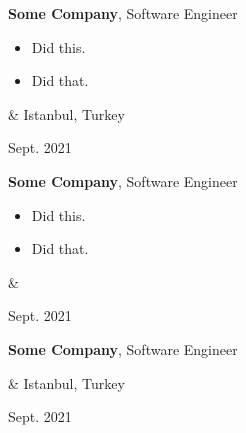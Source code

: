 \documentclass[10pt, letterpaper]{article}
\newenvironment{highlights}{
        \begin{itemize}[
                topsep=0pt,
                parsep=0.10 cm,
                partopsep=0pt,
                itemsep=0pt,
                after=\relax,
                leftmargin=0.4 cm + 3pt
            ]
    }{
        \end{itemize}
    } %
\let\originalTabularx\tabularx
\let\originalEndTabularx\endtabularx
\renewenvironment{tabularx}{\bgroup\centering\originalTabularx}{\originalEndTabularx\par\egroup}
\begin{document}
        \vspace{0.2 cm}
        \begin{tabularx}{
            \textwidth-0.4 cm-0.13cm
        }{
            K{0.2 cm}
            R{4.1 cm}
        }
            \textbf{Some Company}, Software Engineer

            \vspace{0.10 cm}

            \begin{highlights}
                \item Did this.
                \item Did that.
            \end{highlights}
            &
            Istanbul, Turkey

            Sept. 2021
        \end{tabularx}

        \vspace{0.2 cm}
        \begin{tabularx}{
            \textwidth-0.4 cm-0.13cm
        }{
            K{0.2 cm}
            R{4.1 cm}
        }
            \textbf{Some Company}, Software Engineer

            \vspace{0.10 cm}

            \begin{highlights}
                \item Did this.
                \item Did that.
            \end{highlights}
            &
            

            Sept. 2021
        \end{tabularx}

        \vspace{0.2 cm}
        \begin{tabularx}{
            \textwidth-0.4 cm-0.13cm
        }{
            K{0.2 cm}
            R{4.1 cm}
        }
            \textbf{Some Company}, Software Engineer

            \vspace{0.10 cm}

            &
            Istanbul, Turkey

            Sept. 2021
        \end{tabularx}
\end{document}
